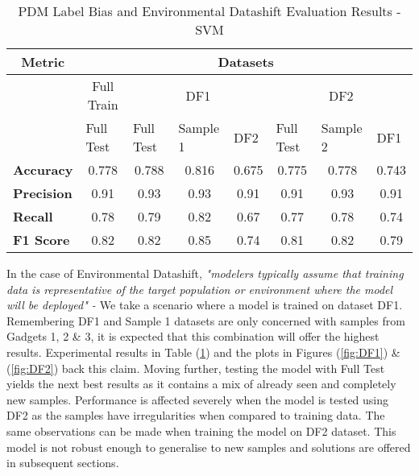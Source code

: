 \bigskip
\begin{table}[H]
    \begin{center}
        \caption{PDM Label Bias and Environmental Datashift Evaluation Results - SVM}
        \label{table:Bias}
        \begin{tabular}{lccccccc}
            \toprule
            \multicolumn{1}{c}{\textbf{Metric}} & \multicolumn{7}{c}{\textbf{Datasets}}                                                                                                                                                                                                      \\ \midrule
            \multicolumn{1}{l}{}      & \multicolumn{1}{c|}{Full Train} & \multicolumn{3}{c|}{DF1}                                                                       & \multicolumn{3}{c}{DF2}                                                                       \\ \cline{2-8} 
            \multicolumn{1}{l}{}      & \multicolumn{1}{l|}{Full Test}  & \multicolumn{1}{l|}{Full Test} & \multicolumn{1}{l|}{Sample 1} & \multicolumn{1}{l|}{DF2} & \multicolumn{1}{l|}{Full Test} & \multicolumn{1}{l|}{Sample 2} & \multicolumn{1}{l}{DF1} \\ 
            \midrule
            \textbf{Accuracy}   & 0.778 &0.788  &0.816  &0.675  &0.775      &0.778  &0.743\\
            \textbf{Precision}  &0.91   &0.93   &0.93   &0.91   &0.91       &0.93   &0.91\\
            \textbf{Recall}     &0.78   &0.79   &0.82   &0.67   &0.77       &0.78   &0.74\\
            \textbf{F1 Score}   &0.82   &0.82   &0.85   &0.74   &0.81       &0.82   &0.79\\
            \bottomrule
        \end{tabular}
    \end{center}
\end{table}

\enlargethispage{\baselineskip}
In the case of Environmental Datashift,\textit{
"modelers typically assume that training data
is representative of the target population or environment where
the model will be deployed" - \cite{saria2019tutorial}}
We take a scenario where a model is trained on dataset DF1.
Remembering DF1 and Sample 1 datasets are only concerned with samples from Gadgets 1, 2 \& 3, it is expected that this combination will offer the highest results.
Experimental results in Table (\ref{table:Bias}) and the plots in Figures (\ref{fig:DF1}) \& (\ref{fig:DF2}) back this claim. 
Moving further, testing the model with Full Test yields the next best results as it contains a mix of already seen and completely new samples.   
Performance is affected severely when the model is tested using DF2 as the samples have irregularities when compared to training data.
The same observations can be made when training the model on DF2 dataset.
This model is not robust enough to generalise to new samples and solutions are offered in subsequent sections. 

